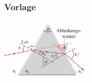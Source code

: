 \subsubsection{Vorlage}

\begin{center}
	\begin{minipage}{0.3\textwidth}
		
	\end{minipage}%
	\begin{minipage}{0.3\textwidth}
		\includegraphics[height=3cm,keepaspectratio=true]{Images/prisma.png}
	\end{minipage}
\end{center}